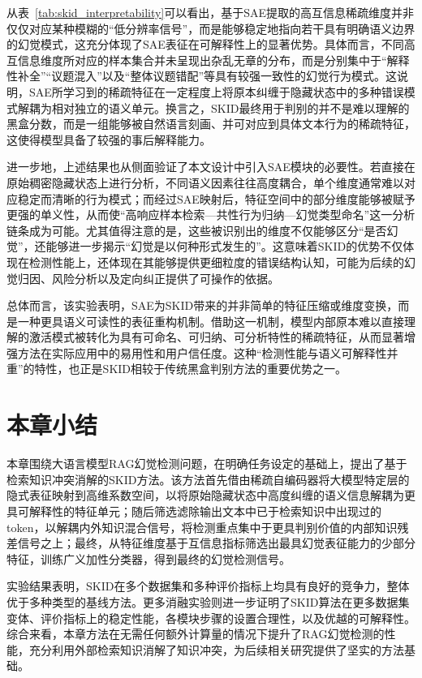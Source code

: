 从表~\ref{tab:skid_interpretability}可以看出，基于SAE提取的高互信息稀疏维度并非仅仅对应某种模糊的“低分辨率信号”，而是能够稳定地指向若干具有明确语义边界的幻觉模式，这充分体现了SAE表征在可解释性上的显著优势。具体而言，不同高互信息维度所对应的样本集合并未呈现出杂乱无章的分布，而是分别集中于“解释性补全”“议题混入”以及“整体议题错配”等具有较强一致性的幻觉行为模式。这说明，SAE所学习到的稀疏特征在一定程度上将原本纠缠于隐藏状态中的多种错误模式解耦为相对独立的语义单元。换言之，SKID最终用于判别的并不是难以理解的黑盒分数，而是一组能够被自然语言刻画、并可对应到具体文本行为的稀疏特征，这使得模型具备了较强的事后解释能力。

进一步地，上述结果也从侧面验证了本文设计中引入SAE模块的必要性。若直接在原始稠密隐藏状态上进行分析，不同语义因素往往高度耦合，单个维度通常难以对应稳定而清晰的行为模式；而经过SAE映射后，特征空间中的部分维度能够被赋予更强的单义性，从而使“高响应样本检索—共性行为归纳—幻觉类型命名”这一分析链条成为可能。尤其值得注意的是，这些被识别出的维度不仅能够区分“是否幻觉”，还能够进一步揭示“幻觉是以何种形式发生的”。这意味着SKID的优势不仅体现在检测性能上，还体现在其能够提供更细粒度的错误结构认知，可能为后续的幻觉归因、风险分析以及定向纠正提供了可操作的依据。

总体而言，该实验表明，SAE为SKID带来的并非简单的特征压缩或维度变换，而是一种更具语义可读性的表征重构机制。借助这一机制，模型内部原本难以直接理解的激活模式被转化为具有可命名、可归纳、可分析特性的稀疏特征，从而显著增强方法在实际应用中的易用性和用户信任度。这种“检测性能与语义可解释性并重”的特性，也正是SKID相较于传统黑盒判别方法的重要优势之一。

\section{本章小结}

本章围绕大语言模型RAG幻觉检测问题，在明确任务设定的基础上，提出了基于检索知识冲突消解的SKID方法。该方法首先借由稀疏自编码器将大模型特定层的隐式表征映射到高维系数空间，以将原始隐藏状态中高度纠缠的语义信息解耦为更具可解释性的特征单元；随后筛选滤除输出文本中已于检索知识中出现过的token，以解耦内外知识混合信号，将检测重点集中于更具判别价值的内部知识残差信号之上；最终，从特征维度基于互信息指标筛选出最具幻觉表征能力的少部分特征，训练广义加性分类器，得到最终的幻觉检测信号。

实验结果表明，SKID在多个数据集和多种评价指标上均具有良好的竞争力，整体优于多种类型的基线方法。更多消融实验则进一步证明了SKID算法在更多数据集变体、评价指标上的稳定性能，各模块步骤的设置合理性，以及优越的可解释性。综合来看，本章方法在无需任何额外计算量的情况下提升了RAG幻觉检测的性能，充分利用外部检索知识消解了知识冲突，为后续相关研究提供了坚实的方法基础。

